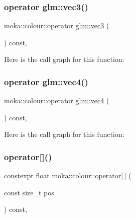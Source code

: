 \subsubsection{\texorpdfstring{operator glm::vec3()}{operator glm::vec3()}}
{\footnotesize\ttfamily moka\+::colour\+::operator \mbox{\hyperlink{namespacemoka_aed2224bc0e5b79e57a8975ded94ee1aaa97ade28e93c0de60adc075bdbe07ca36}{glm\+::vec3}} (\begin{DoxyParamCaption}{ }\end{DoxyParamCaption}) const\hspace{0.3cm}{\ttfamily [inline]}, {\ttfamily [noexcept]}}

Here is the call graph for this function\+:
\mbox{\label{classmoka_1_1colour_ae61f128c67947c870a5daa830de23d67}} 
\subsubsection{\texorpdfstring{operator glm::vec4()}{operator glm::vec4()}}
{\footnotesize\ttfamily moka\+::colour\+::operator \mbox{\hyperlink{namespacemoka_aed2224bc0e5b79e57a8975ded94ee1aaa1a9028fd802c481a99491a418ca2fe86}{glm\+::vec4}} (\begin{DoxyParamCaption}{ }\end{DoxyParamCaption}) const\hspace{0.3cm}{\ttfamily [inline]}, {\ttfamily [noexcept]}}

Here is the call graph for this function\+:
\mbox{\label{classmoka_1_1colour_ae28feff4fd8815b6612ef4cf16b026b8}} 
\subsubsection{\texorpdfstring{operator[]()}{operator[]()}}
{\footnotesize\ttfamily constexpr float moka\+::colour\+::operator\mbox{[}$\,$\mbox{]} (\begin{DoxyParamCaption}\item[{const size\+\_\+t}]{pos }\end{DoxyParamCaption}) const\hspace{0.3cm}{\ttfamily [inline]}, {\ttfamily [noexcept]}}

